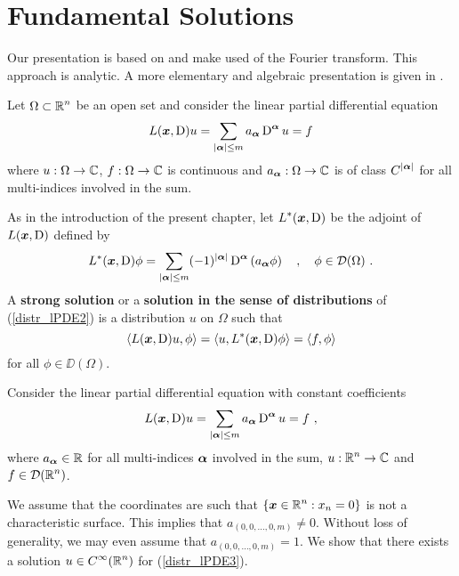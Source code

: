 \section{Fundamental Solutions}

Our presentation is based on \cite{FoPDE} and make used of the Fourier
transform.  This approach is analytic.  A more elementary and algebraic
presentation is given in \cite{Smo}.

Let $\displaystyle \Omega \subset \mathbb{R}^n$ be an open set and consider
the linear partial differential equation
\begin{equation} \label{distr_lPDE2}
L({\bm{x}},\operatorname{D})u = \sum_{|{\bm{\alpha}}|\leq m} a_{{\bm{\alpha}}}
\operatorname{D}^{{\bm{\alpha}}} u = f
\end{equation}
where $u:\Omega \rightarrow \mathbb{C}$, $f:\Omega \rightarrow \mathbb{C}$ is
continuous and $a_{{\bm{\alpha}}}:\Omega \rightarrow \mathbb{C}$ is of class
$\displaystyle C^{|{\bm{\alpha}}|}$ for all multi-indices involved in the sum.

As in the introduction of the present chapter, let
$\displaystyle L^\ast({\bm{x}}, \operatorname{D})$ 
be the adjoint of $L({\bm{x}}, \operatorname{D})$ defined by
\[
L^\ast({\bm{x}},\operatorname{D})\phi = \sum_{|{\bm{\alpha}}|\leq m} (-1)^{|{\bm{\alpha}}|}
\operatorname{D}^{{\bm{\alpha}}} \left(a_{{\bm{\alpha}}} \phi \right) \quad , \quad \phi \in
\mathcal{D}(\Omega) \ .
\]
A {\bfseries strong solution} or a
{\bfseries solution in the sense of distributions}
of (\ref{distr_lPDE2}) is a distribution $u$ on $\Omega$ such that
\[
\left\langle{L({\bm{x}},\operatorname{D})u} , {\phi}\right\rangle = \left\langle{u} , {L^\ast({\bm{x}},\operatorname{D})\phi}\right\rangle =
\left\langle{f} , {\phi}\right\rangle
\]
for all $\phi \in \DD(\Omega)$.

Consider the linear partial differential equation with constant coefficients
\begin{equation} \label{distr_lPDE3}
L({\bm{x}},\operatorname{D})u = \sum_{|{\bm{\alpha}}|\leq m} a_{{\bm{\alpha}}}
\operatorname{D}^{{\bm{\alpha}}} u = f \  ,
\end{equation}
where $a_{{\bm{\alpha}}} \in \mathbb{R}$ for all multi-indices ${\bm{\alpha}}$
involved in the sum, $\displaystyle u:\mathbb{R}^n \rightarrow \mathbb{C}$ and
$\displaystyle f \in \mathcal{D}(\mathbb{R}^n)$.

We assume that the coordinates are such that
$\displaystyle \{ {\bm{x}} \in \mathbb{R}^n : x_n=0 \}$ is not a characteristic surface.
This implies that $a_{(0,0,\ldots,0,m)} \neq 0$.  Without loss of
generality, we may even assume that $a_{(0,0,\ldots,0,m)} = 1$.
We show that there exists a solution $\displaystyle u \in C^\infty(\mathbb{R}^n)$ for
(\ref{distr_lPDE3}).

